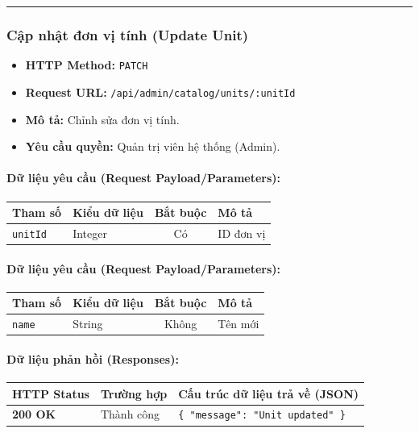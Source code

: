 \documentclass[12pt,a4paper]{article}
\begin{document}
\vskip 0.4cm
\noindent\rule{\textwidth}{0.3pt}
\vskip 0.4cm

\subsubsection{Cập nhật đơn vị tính (Update Unit)}
\begin{itemize}[leftmargin=*]
    \item \textbf{HTTP Method:} \texttt{PATCH}
    \item \textbf{Request URL:} \texttt{/api/admin/catalog/units/:unitId}
    \item \textbf{Mô tả:} Chỉnh sửa đơn vị tính.
    \item \textbf{Yêu cầu quyền:} Quản trị viên hệ thống (Admin).
\end{itemize}

\paragraph{Dữ liệu yêu cầu (Request Payload/Parameters):}
\begin{longtable}{|>{\raggedright\arraybackslash}p{2.8cm}|>{\raggedright\arraybackslash}p{2.2cm}|c|>{\raggedright\arraybackslash}p{7.0cm}|}
\hline
\textbf{Tham số} & \textbf{Kiểu dữ liệu} & \textbf{Bắt buộc} & \textbf{Mô tả} \\ \hline
\endhead
\texttt{unitId} & Integer & Có & ID đơn vị \\ \hline
\end{longtable}

\paragraph{Dữ liệu yêu cầu (Request Payload/Parameters):}
\begin{longtable}{|>{\raggedright\arraybackslash}p{2.8cm}|>{\raggedright\arraybackslash}p{2.2cm}|c|>{\raggedright\arraybackslash}p{7.0cm}|}
\hline
\textbf{Tham số} & \textbf{Kiểu dữ liệu} & \textbf{Bắt buộc} & \textbf{Mô tả} \\ \hline
\endhead
\texttt{name} & String & Không & Tên mới \\ \hline
\end{longtable}

\paragraph{Dữ liệu phản hồi (Responses):}
\begin{longtable}{|>{\raggedright\arraybackslash}p{2.8cm}|>{\raggedright\arraybackslash}p{3.2cm}|>{\raggedright\arraybackslash}p{8.0cm}|}
\hline
\textbf{HTTP Status} & \textbf{Trường hợp} & \textbf{Cấu trúc dữ liệu trả về (JSON)} \\ \hline
\endhead
\textbf{200 OK} & Thành công & \texttt{\{ "message": "Unit updated" \}} \\ \hline
\end{longtable}
\end{document}
